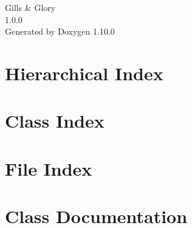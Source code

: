 \documentclass[twoside]{book}
\newcommand{\+}{\discretionary{\mbox{\scriptsize$\hookleftarrow$}}{}{}}
\newcommand{\clearemptydoublepage}{%
    \newpage{\pagestyle{empty}\cleardoublepage}%
  }
\begin{document}
  \raggedbottom
    \hypersetup{pageanchor=false,
                bookmarksnumbered=true,
                pdfencoding=unicode
               }
  \begin{titlepage}
  \vspace*{7cm}
  \begin{center}%
  {\Large Gills \& Glory}\\
  [1ex]\large 1.\+0.\+0 \\
  \vspace*{1cm}
  {\large Generated by Doxygen 1.10.0}\\
  \end{center}
  \end{titlepage}
  \clearemptydoublepage
  \tableofcontents
  \clearemptydoublepage
  \hypersetup{pageanchor=true}
\chapter{Hierarchical Index}

\chapter{Class Index}

\chapter{File Index}

\chapter{Class Documentation}

































\end{document}

